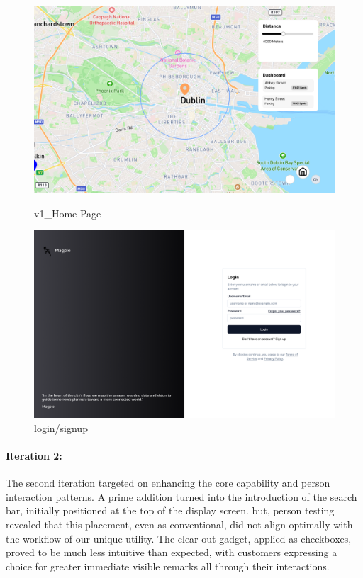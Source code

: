 \begin{figure}[h]
    \centering
    \begin{minipage}{0.48\textwidth}
        \centering
        \includegraphics[width=\textwidth]{images/v1_Home Page.png}
        \caption{v1\_Home Page}
        \label{fig:v1_Home Page}
    \end{minipage}
    \hfill
    \begin{minipage}{0.48\textwidth}
        \centering
        \includegraphics[width=\textwidth]{images/v1_Login.png}
        \caption{login/signup}
        \label{fig:v1 Login}
    \end{minipage}
\end{figure}


\paragraph{Iteration 2:}
The second iteration targeted on enhancing the core capability and person interaction patterns. A prime addition turned into the introduction of the search bar, initially positioned at the top of the display screen. but, person testing revealed that this placement, even as conventional, did not align optimally with the workflow of our unique utility. The clear out gadget, applied as checkboxes, proved to be much less intuitive than expected, with customers expressing a choice for greater immediate visible remarks all through their interactions.

